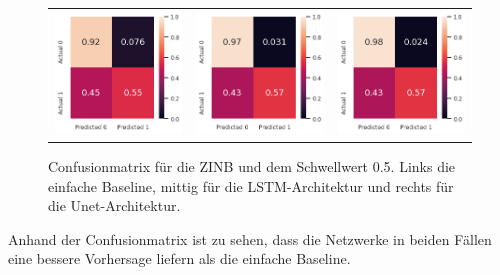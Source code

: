 \begin{figure}[h]
\begin{tabular}{ccc}
\includegraphics[width=45mm]{abb/simpleBaseLine.png}&
\includegraphics[width=45mm]{abb/znBinomConfusion_LSTM.png}&
\includegraphics[width=45mm]{abb/znBinomConfusion_UNET.png}
\end{tabular}
\caption{Confusionmatrix für die ZINB und dem Schwellwert 0.5. Links die einfache Baseline, mittig für die LSTM-Architektur und rechts für die Unet-Architektur. \label{fig:confusionmatrix_binom}}
\end{figure}

\noindent Anhand der Confusionmatrix ist zu sehen, dass die Netzwerke in beiden Fällen eine bessere Vorhersage liefern als die einfache Baseline.

